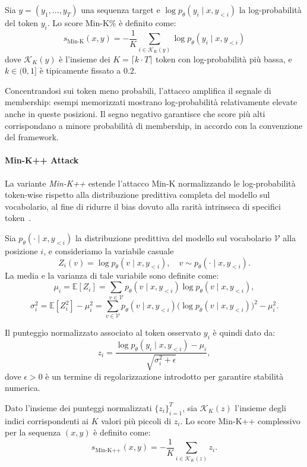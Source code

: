 Sia $y = (y_1, \dots, y_T)$ una sequenza target e $\log p_\theta(y_i \mid x, y_{<i})$ la log-probabilità del token $y_i$. Lo score Min-K\% è definito come:
\[
s_{\text{Min-K}}(x, y) = -\frac{1}{K} \sum_{i \in \mathcal{K}_K(y)} 
\log p_\theta(y_i \mid x, y_{<i})
\]
dove $\mathcal{K}_K(y)$ è l’insieme dei $K = \lceil k \cdot T \rceil$ token con log-probabilità più bassa, e $k \in (0,1]$ è tipicamente fissato a $0.2$.

Concentrandosi sui token meno probabili, l’attacco amplifica il segnale di membership: esempi memorizzati mostrano log-probabilità relativamente elevate anche in queste posizioni. Il segno negativo garantisce che score più alti corrispondano a minore probabilità di membership, in accordo con la convenzione del framework.

\paragraph{Min-K++ Attack}
La variante \emph{Min-K++} estende l’attacco Min-K normalizzando le log-probabilità token-wise rispetto alla distribuzione predittiva completa del modello sul vocabolario, al fine di ridurre il bias dovuto alla rarità intrinseca di specifici token~\cite{shi2024detectingpretrainingdatalarge}.

Sia $p_\theta(\cdot \mid x, y_{<i})$ la distribuzione predittiva del modello sul vocabolario $\mathcal{V}$ alla posizione $i$, e consideriamo la variabile casuale
\[
Z_i(v) = \log p_\theta(v \mid x, y_{<i}), \quad v \sim p_\theta(\cdot \mid x, y_{<i}).
\]
La media e la varianza di tale variabile sono definite come:
\[
\mu_i = \mathbb{E}[Z_i] 
= \sum_{v \in \mathcal{V}} p_\theta(v \mid x, y_{<i}) \log p_\theta(v \mid x, y_{<i}),
\]
\[
\sigma_i^2 = \mathbb{E}[Z_i^2] - \mu_i^2
= \sum_{v \in \mathcal{V}} p_\theta(v \mid x, y_{<i})
\bigl(\log p_\theta(v \mid x, y_{<i})\bigr)^2 - \mu_i^2.
\]

Il punteggio normalizzato associato al token osservato $y_i$ è quindi dato da:
\[
z_i =
\frac{\log p_\theta(y_i \mid x, y_{<i}) - \mu_i}
{\sqrt{\sigma_i^2 + \epsilon}},
\]
dove $\epsilon > 0$ è un termine di regolarizzazione introdotto per garantire stabilità numerica.

Dato l’insieme dei punteggi normalizzati $\{z_i\}_{i=1}^T$, sia $\mathcal{K}_K(z)$ l’insieme degli indici corrispondenti ai $K$ valori più piccoli di $z_i$. Lo score Min-K++ complessivo per la sequenza $(x,y)$ è definito come:
\[
s_{\text{Min-K++}}(x, y)
= -\frac{1}{K} \sum_{i \in \mathcal{K}_K(z)} z_i.
\]

